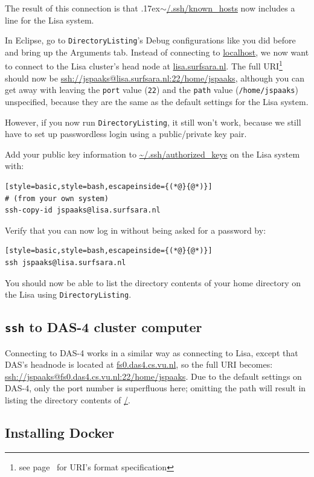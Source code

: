 \documentclass[12pt, a4paper, twoside, openany, titlepage]{book}
\newcommand{\mytilde}{\raise.17ex\hbox{$\scriptstyle\sim$}}
\begin{document}
The result of this connection is that \mytilde\url{/.ssh/known_hosts} now includes a line for the Lisa system.

In Eclipse, go to \texttt{DirectoryListing}'s \textsf{Debug configurations} like you did before and bring up the \textsf{Arguments} tab. Instead of connecting to \url{localhost}, we now want to connect to the Lisa cluster's head node at \url{lisa.surfsara.nl}. The full URI\footnote{see page~\pageref{footnote:format-uri} for URI's format specification} should now be \url{ssh://jspaaks@lisa.surfsara.nl:22/home/jspaaks}, although you can get away with leaving the \texttt{port} value (\texttt{22}) and the \texttt{path} value (\texttt{/home/jspaaks}) unspecified, because they are the same as the default settings for the Lisa system.

However, if you now run \texttt{DirectoryListing}, it still won't work, because we still have to set up passwordless login using a public/private key pair.

Add your public key information to \url{~/.ssh/authorized_keys} on the Lisa system with:
\begin{lstlisting}[style=basic,style=bash,escapeinside={(*@}{@*)}]
# (from your own system)
ssh-copy-id jspaaks@lisa.surfsara.nl
\end{lstlisting}
Verify that you can now log in without being asked for a password by:
\begin{lstlisting}[style=basic,style=bash,escapeinside={(*@}{@*)}]
ssh jspaaks@lisa.surfsara.nl
\end{lstlisting}
You should now be able to list the directory contents of your home directory on the Lisa using \texttt{DirectoryListing}.




\subsection{\texttt{ssh} to DAS-4 cluster computer}

Connecting to DAS-4 works in a similar way as connecting to Lisa, except that DAS's headnode is located at \url{fs0.das4.cs.vu.nl}, so the full URI becomes:\\ \url{ssh://jspaaks@fs0.das4.cs.vu.nl:22/home/jspaaks}. Due to the default settings on DAS-4, only the port number is superfluous here; omitting the path will result in listing the directory contents of \url{/}.


\subsection{Installing Docker}
\end{document}
